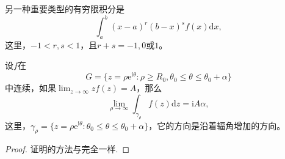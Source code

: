 \documentclass[../../main.tex]{subfiles}%
\begin{document}
另一种重要类型的有穷限积分是
\[
\int_{a}^{b} (x - a)^r (b - x)^s f(x) \mathrm{d}x,
\]
这里，\( -1 < r, s < 1 \)，且\( r + s = -1, 0 \)或\( 1 \)。

\begin{lemma}\label{lemma:引理5.5.15}
设\( f \)在
\[
G = \{ z = \rho \mathrm{e}^{\mathrm{i}\theta} : \rho \geqslant R_0, \theta_0 \leqslant \theta \leqslant \theta_0 + \alpha \}
\]
中连续，如果\(\lim_{z \to \infty} z f(z) = A\)，那么
\[
\lim_{\rho \to \infty} \int_{\gamma_{\rho}} f(z) \mathrm{d}z = \mathrm{i}A\alpha,
\]
这里，\(\gamma_{\rho} = \{ z = \rho \mathrm{e}^{\mathrm{i}\theta} : \theta_0 \leqslant \theta \leqslant \theta_0 + \alpha \}\)，它的方向是沿着辐角增加的方向。
\end{lemma}
\begin{proof}
证明的方法与完全一样.
\end{proof}
\end{document}
